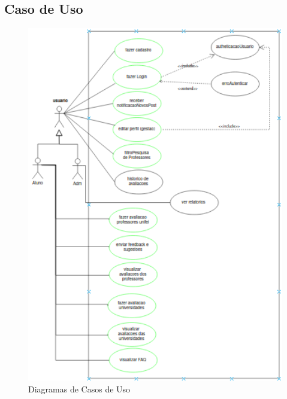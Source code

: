 \documentclass[12pt]{article}
\begin{document}
  \subsection{Caso de Uso}
  \begin{figure}[h]
  \centering
  \includegraphics[width=1\textwidth]{diagramas/diag-casos-de-uso.png} %
  \caption{Diagramas de Casos de Uso}
  \end{figure}
  
\end{document}
